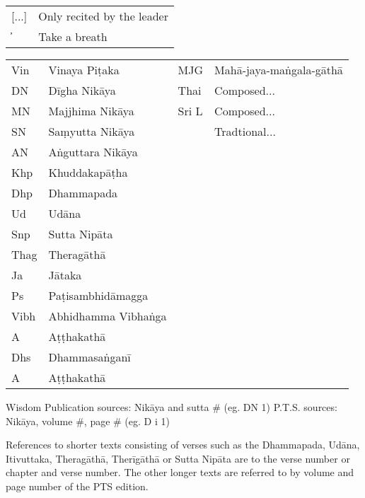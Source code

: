 \clearpage
\thispagestyle{empty}

{}
\bigskip

{\raggedright
\ifhandbookedition
\fontsize{9}{13}\selectfont
\else
\fontsize{10}{14}\selectfont
\fi

\begin{tabular}{@{}ll@{}}
[...] & Only recited by the leader \\
̓     & Take a breath               \\
\end{tabular}

\begin{tabular}{@{}llll@{}}
  Vin  & Vinaya Piṭaka       & MJG   & Mahā-jaya-maṅgala-gāthā \\
  DN   & Dīgha Nikāya        & Thai  & Composed...             \\
  MN   & Majjhima Nikāya     & Sri L & Composed...             \\
  SN   & Saṃyutta Nikāya     &       & Tradtional...           \\
  AN   & Aṅguttara Nikāya    &       &                 \\
  Khp  & Khuddakapāṭha       &       &                 \\
  Dhp  & Dhammapada          &       &                 \\
  Ud   & Udāna               &       &                 \\
  Snp  & Sutta Nipāta        &       &                 \\
  Thag & Theragāthā          &       &                 \\
  Ja   & Jātaka              &       &                 \\
  Ps   & Paṭisambhidāmagga   &       &                 \\
  Vibh & Abhidhamma Vibhaṅga &       &                 \\
  A    & Aṭṭhakathā          &       &                 \\
  Dhs  & Dhammasaṅganī       &       &                 \\
  A    & Aṭṭhakathā          &       &                 \\

\end{tabular}

\bigskip

Wisdom Publication sources: Nikāya and sutta # (eg. DN 1)
P.T.S. sources: Nikāya, volume #, page # (eg. D i 1)

References to shorter texts consisting of verses such as the Dhammapada, Udāna,
Itivuttaka, Theragāthā, Therīgāthā or Sutta Nipāta are to the verse number or
chapter and verse number. The other longer texts are referred to by volume and
page number of the PTS edition.

}

